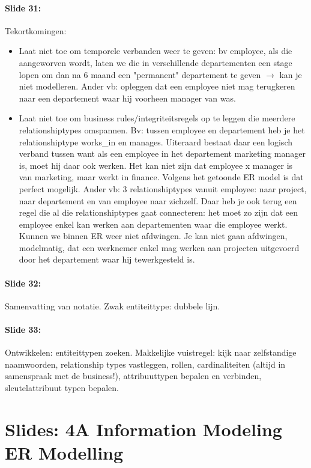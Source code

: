 \documentclass[10pt,a4paper]{report}
\begin{document}
\paragraph{Slide 31:}Tekortkomingen:
\begin{itemize}
\item Laat niet toe om temporele verbanden weer te geven: bv employee, als die aangeworven wordt, laten we die in verschillende departementen een stage lopen om dan na 6 maand een "permanent" departement te geven $\rightarrow$ kan je niet modelleren. Ander vb: opleggen dat een employee niet mag terugkeren naar een departement waar hij voorheen manager van was.
\item Laat niet toe om business rules/integriteitsregels op te leggen die meerdere relationshiptypes omspannen. Bv: tussen employee en departement heb je het relationshiptype works\_in en manages. Uiteraard bestaat daar een logisch verband tussen want als een employee in het departement marketing manager is, moet hij daar ook werken. Het kan niet zijn dat employee x manager is van marketing, maar werkt in finance. Volgens het getoonde ER model is dat perfect mogelijk. Ander vb: 3 relationshiptypes vanuit employee: naar project, naar departement en van employee naar zichzelf. Daar heb je ook terug een regel die al die relationshiptypes gaat connecteren: het moet zo zijn dat een employee enkel kan werken aan departementen waar die employee werkt. Kunnen we binnen ER weer niet afdwingen. Je kan niet gaan afdwingen, modelmatig, dat een werknemer enkel mag werken aan projecten uitgevoerd door het departement waar hij tewerkgesteld is.
\end{itemize}

\paragraph{Slide 32:}Samenvatting van notatie. Zwak entiteittype: dubbele lijn.

\paragraph{Slide 33:}Ontwikkelen: entiteittypen zoeken. Makkelijke vuistregel: kijk naar zelfstandige naamwoorden, relationship types vastleggen, rollen, cardinaliteiten (altijd in samenspraak met de business!), attribuuttypen bepalen en verbinden, sleutelattribuut typen bepalen.

\section{Slides: 4A Information Modeling \- ER Modelling}
\end{document}
